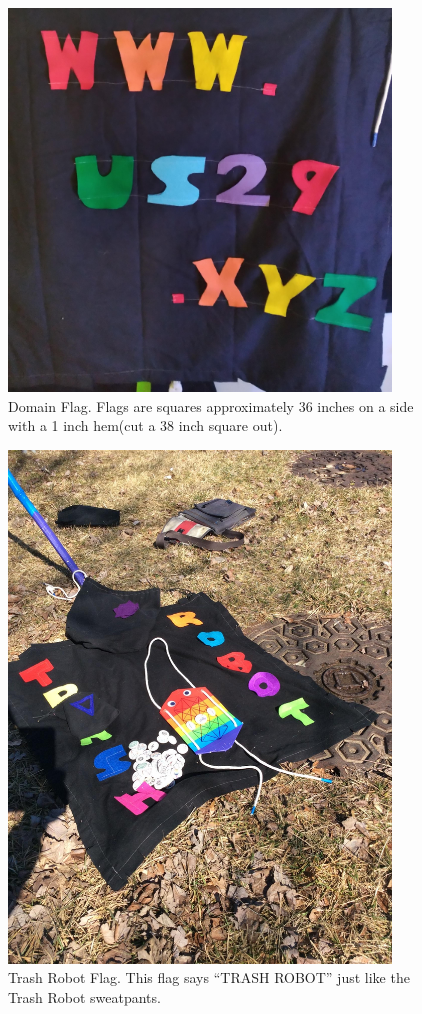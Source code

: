 \begin{figure}
	\centering
	\includegraphics[width=4in]{figures/trashrobot/flag.jpg}
	\caption[flag]
	{Domain Flag. Flags are squares approximately 36 inches on a side with a 1 inch hem(cut a 38 inch square out).}
\end{figure}

\begin{figure}
	\centering
	\includegraphics[width=4in]{figures/trashrobot/flagtrashrobot.jpg}
	\caption[flagtrashrobot]
	{Trash Robot Flag. This flag says ``TRASH ROBOT'' just like the Trash Robot sweatpants.}
\end{figure}

